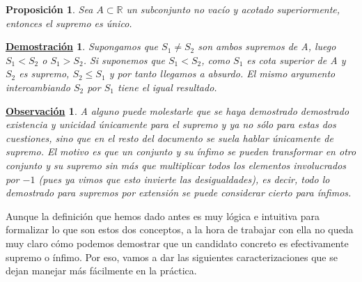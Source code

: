 \documentclass[10pt,a4paper,openright]{book}
\theoremstyle{break}
\newtheorem{prop}{Proposición}[chapter]
\newtheorem*{demo}{\underline{Demostración}}
\newtheorem{obs}{\underline{Observación}}[chapter]
\begin{document}
\begin{prop}
Sea $A\subset \mathbb{R}$ un subconjunto no vacío y acotado superiormente, entonces el supremo es único.
\end{prop}
\begin{demo}
Supongamos que $S_1\neq S_2$ son ambos supremos de A, luego $S_1<S_2$ o $S_1>S_2$. Si suponemos que $S_1<S_2$, como $S_1$ es cota superior de A y $S_2$ es supremo, $S_2\leq S_1$ y por tanto llegamos a absurdo. El mismo argumento intercambiando $S_2$ por $S_1$ tiene el igual resultado.
\end{demo}

\begin{obs}
A alguno puede molestarle que se haya demostrado demostrado existencia y unicidad únicamente para el supremo y ya no sólo para estas dos cuestiones, sino que en el resto del documento se suela hablar únicamente de supremo. El motivo es que un conjunto y su ínfimo se pueden transformar en otro conjunto y su supremo sin más que multiplicar todos los elementos involucrados por $-1$ (pues ya vimos que esto invierte las desigualdades), es decir, todo lo demostrado para supremos por extensión se puede considerar cierto para ínfimos.
\end{obs}

Aunque la definición que hemos dado antes es muy lógica e intuitiva para formalizar lo que son estos dos conceptos, a la hora de trabajar con ella no queda muy claro cómo podemos demostrar que un candidato concreto es efectivamente supremo o ínfimo. Por eso, vamos a dar las siguientes caracterizaciones que se dejan manejar más fácilmente en la práctica.
\end{document}
